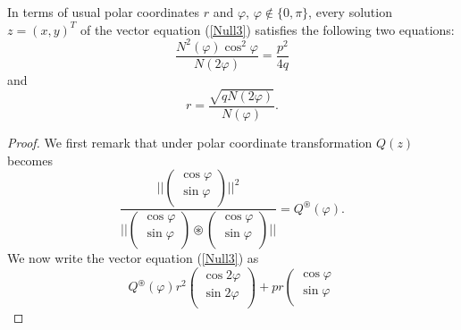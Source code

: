 \documentclass[10pt,a4paper]{amsart}
\begin{document}
\begin{thm}
In terms of usual polar coordinates $r$ and $\varphi$, $\varphi \notin \{0,\pi\}$, every  solution $z=(x,y)^T$ of the vector equation (\ref{Null3}) satisfies the following two equations:
\begin{equation}\label{4.5}
\frac{N^2(\varphi)\cos^2\varphi}{N(2\varphi)}=\frac{p^2}{4q}
\end{equation}
and
\begin{equation}\label{4.6}r=\frac{\sqrt{q N(2\varphi)}}{N(\varphi)}.
\end{equation}
\end{thm}

\begin{proof}
We first remark that under polar coordinate transformation $Q(z)$ becomes
\[  \frac{||\left(
                  \begin{array}{c}
                    \cos\varphi \\
                    \sin\varphi \\
                  \end{array}
                \right)
                ||^2}{||\left(
                  \begin{array}{c}
                    \cos\varphi \\
                    \sin\varphi \\
                  \end{array}
                \right)\circledast \left(
                  \begin{array}{c}
                    \cos\varphi \\
                    \sin\varphi \\
                  \end{array}
                \right)
||}=Q^{\circledast
}(\varphi).\]
We now
write the vector equation (\ref{Null3}) as
\[Q^{\circledast}(\varphi)r^2\left(
                      \begin{array}{c}
                        \cos2\varphi \\
                        \sin2\varphi \\
                      \end{array}
                    \right)
+pr\left(
                                  \begin{array}{c}
                                    \cos\varphi \\
                        \sin\varphi \\
                                  \end{array}
\]
\end{proof}
\end{document}
